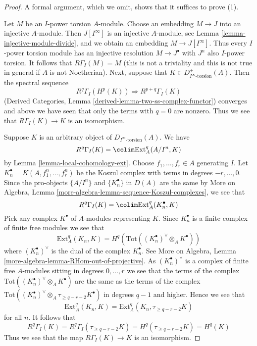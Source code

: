 \begin{proof}
A formal argument, which we omit, shows that it suffices to prove (1).

\medskip\noindent
Let $M$ be an $I$-power torsion $A$-module. Choose an embedding
$M \to J$ into an injective $A$-module. Then $J[I^\infty]$ is
an injective $A$-module, see Lemma \ref{lemma-injective-module-divide},
and we obtain an embedding $M \to J[I^\infty]$.
Thus every $I$-power torsion module has an injective resolution
$M \to J^\bullet$ with $J^n$ also $I$-power torsion. It follows
that $R\Gamma_I(M) = M$ (this is not a triviality and this is not
true in general if $A$ is not Noetherian). Next, suppose that
$K \in D_{I^\infty\text{-torsion}}^+(A)$. Then the spectral sequence
$$
R^q\Gamma_I(H^p(K)) \Rightarrow R^{p + q}\Gamma_I(K)
$$
(Derived Categories, Lemma \ref{derived-lemma-two-ss-complex-functor})
converges and above we have seen that only the terms with $q = 0$
are nonzero. Thus we see that $R\Gamma_I(K) \to K$ is an isomorphism.

\medskip\noindent
Suppose $K$ is an arbitrary object of $D_{I^\infty\text{-torsion}}(A)$.
We have
$$
R^q\Gamma_I(K) = \colim \text{Ext}^q_A(A/I^n, K)
$$
by Lemma \ref{lemma-local-cohomology-ext}. Choose $f_1, \ldots, f_r \in A$
generating $I$. Let $K_n^\bullet = K(A, f_1^n, \ldots, f_r^n)$ be the
Koszul complex with terms in degrees $-r, \ldots, 0$. Since the
pro-objects $\{A/I^n\}$ and $\{K_n^\bullet\}$ in $D(A)$ are the same by
More on Algebra, Lemma \ref{more-algebra-lemma-sequence-Koszul-complexes},
we see that
$$
R^q\Gamma_I(K) = \colim \text{Ext}^q_A(K_n^\bullet, K)
$$
Pick any complex $K^\bullet$ of $A$-modules representing $K$.
Since $K_n^\bullet$ is a finite complex of finite free modules we see
that
$$
\text{Ext}^q_A(K_n, K) =
H^q(\text{Tot}((K_n^\bullet)^\vee \otimes_A K^\bullet))
$$
where $(K_n^\bullet)^\vee$ is the dual of the complex $K_n^\bullet$.
See More on Algebra, Lemma \ref{more-algebra-lemma-RHom-out-of-projective}.
As $(K_n^\bullet)^\vee$ is a complex of finite free $A$-modules sitting
in degrees $0, \ldots, r$ we see that the terms of the complex
$\text{Tot}((K_n^\bullet)^\vee \otimes_A K^\bullet)$ are the
same as the terms of the complex
$\text{Tot}((K_n^\bullet)^\vee \otimes_A \tau_{\geq q - r - 2} K^\bullet)$
in degrees $q - 1$ and higher. Hence we see that
$$
\text{Ext}^q_A(K_n, K) = \text{Ext}^q_A(K_n, \tau_{\geq q - r - 2}K)
$$
for all $n$. It follows that
$$
R^q\Gamma_I(K) = R^q\Gamma_I(\tau_{\geq q - r - 2}K) =
H^q(\tau_{\geq q - r - 2}K) = H^q(K)
$$
Thus we see that the map $R\Gamma_I(K) \to K$ is an isomorphism.
\end{proof}

